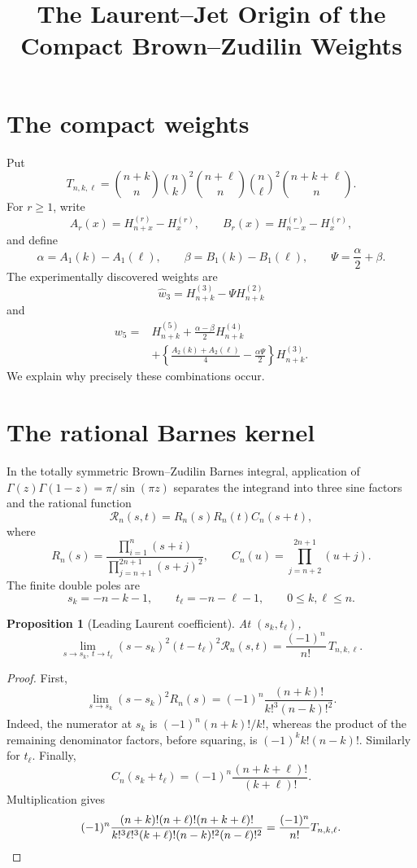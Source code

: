 \documentclass[11pt]{article}
\title{The Laurent--Jet Origin of the Compact Brown--Zudilin Weights}
\author{}
\date{}
\newtheorem{proposition}{Proposition}
\newcommand{\Hh}[2]{H_{#1}^{(#2)}}
\begin{document}
\maketitle

\section{The compact weights}

Put
\[
 T_{n,k,\ell}
 =
 \binom{n+k}{n}\binom nk^2
 \binom{n+\ell}{n}\binom n\ell^2
 \binom{n+k+\ell}{n}.
\]
For \(r\geq1\), write
\[
 A_r(x)=\Hh{n+x}{r}-\Hh{x}{r},
 \qquad
 B_r(x)=\Hh{n-x}{r}-\Hh{x}{r},
\]
and define
\[
 \alpha=A_1(k)-A_1(\ell),\qquad
 \beta=B_1(k)-B_1(\ell),\qquad
 \Psi=\frac{\alpha}{2}+\beta.
\]
The experimentally discovered weights are
\[
 \widehat w_3
 =\Hh{n+k}{3}-\Psi\Hh{n+k}{2}
\]
and
\[
\begin{split}
 w_5={}&\Hh{n+k}{5}
 +\frac{\alpha-\beta}{2}\Hh{n+k}{4}\\
 &+
 \left\{
 \frac{A_2(k)+A_2(\ell)}4
 -\frac{\alpha\Psi}{2}
 \right\}\Hh{n+k}{3}.
\end{split}
\]
We explain why precisely these combinations occur.

\section{The rational Barnes kernel}

In the totally symmetric Brown--Zudilin Barnes integral, application of
\(\Gamma(z)\Gamma(1-z)=\pi/\sin(\pi z)\) separates the integrand into three
sine factors and the rational function
\[
 \mathcal R_n(s,t)=R_n(s)R_n(t)C_n(s+t),
\]
where
\[
 R_n(s)=
 \frac{\prod_{i=1}^{n}(s+i)}
      {\prod_{j=n+1}^{2n+1}(s+j)^2},
 \qquad
 C_n(u)=\prod_{j=n+2}^{2n+1}(u+j).
\]
The finite double poles are
\[
 s_k=-n-k-1,\qquad t_\ell=-n-\ell-1,
 \qquad 0\leq k,\ell\leq n.
\]

\begin{proposition}[Leading Laurent coefficient]
\label{prop:leading}
At \((s_k,t_\ell)\),
\[
 \lim_{s\to s_k,\ t\to t_\ell}
 (s-s_k)^2(t-t_\ell)^2\mathcal R_n(s,t)
 =
 \frac{(-1)^n}{n!}\,T_{n,k,\ell}.
\]
\end{proposition}

\begin{proof}
First,
\[
 \lim_{s\to s_k}(s-s_k)^2R_n(s)
 =
 (-1)^n\frac{(n+k)!}{k!^3(n-k)!^2}.
\]
Indeed, the numerator at \(s_k\) is
\((-1)^n(n+k)!/k!\), whereas the product of the remaining denominator
factors, before squaring, is
\((-1)^k k!(n-k)!\).
Similarly for \(t_\ell\).  Finally,
\[
 C_n(s_k+t_\ell)
 =
 (-1)^n\frac{(n+k+\ell)!}{(k+\ell)!}.
\]
Multiplication gives
\[
 (-1)^n
 \frac{(n+k)!(n+\ell)!(n+k+\ell)!}
 {k!^3\ell!^3(k+\ell)!(n-k)!^2(n-\ell)!^2}
 =\frac{(-1)^n}{n!}T_{n,k,\ell}.
\qedhere
\]
\end{proof}
\end{document}
